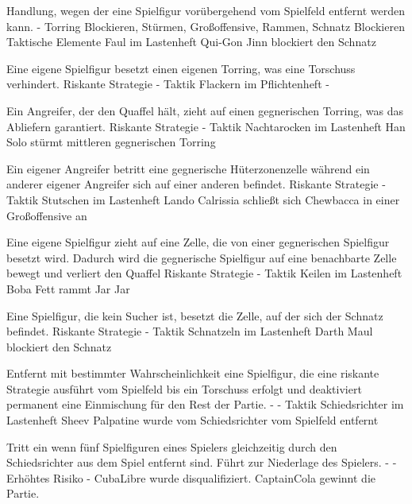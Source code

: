 {Handlung, wegen der eine Spielfigur vorübergehend vom Spielfeld entfernt werden kann.}
{-}
{Torring Blockieren, Stürmen, Großoffensive, Rammen, Schnatz Blockieren}
{Taktische Elemente}
{\glqq{}Faul\grqq{}  im Lastenheft}
{Qui-Gon Jinn blockiert den Schnatz}

{Eine eigene Spielfigur besetzt einen eigenen Torring, was eine Torschuss verhindert.}
{Riskante Strategie}
{-}
{Taktik}
{\glqq{}Flackern\grqq{}  im Pflichtenheft}
{-}

{Ein Angreifer, der den Quaffel hält, zieht auf einen gegnerischen Torring, was das Abliefern garantiert.}
{Riskante Strategie}
{-}
{Taktik}
{\glqq{}Nachtarocken\grqq{}  im Lastenheft}
{Han Solo stürmt mittleren gegnerischen Torring}

{Ein eigener Angreifer betritt eine gegnerische Hüterzonenzelle während ein anderer eigener Angreifer sich auf einer anderen befindet.}
{Riskante Strategie}
{-}
{Taktik}
{\glqq{}Stutschen\grqq{}  im Lastenheft}
{Lando Calrissia schließt sich Chewbacca in einer Großoffensive an}

{Eine eigene Spielfigur zieht auf eine Zelle, die von einer gegnerischen Spielfigur besetzt wird. Dadurch wird die gegnerische Spielfigur auf eine benachbarte Zelle bewegt und verliert den Quaffel}
{Riskante Strategie}
{-}
{Taktik}
{\glqq{}Keilen\grqq{}  im Lastenheft}
{Boba Fett rammt Jar Jar}

{Eine Spielfigur, die kein Sucher ist, besetzt die Zelle, auf der sich der Schnatz befindet.}
{Riskante Strategie}
{-}
{Taktik}
{\glqq{}Schnatzeln\grqq{}  im Lastenheft}
{Darth Maul blockiert den Schnatz}

{Entfernt mit bestimmter Wahrscheinlichkeit eine Spielfigur, die eine riskante Strategie ausführt vom Spielfeld bis ein Torschuss erfolgt und deaktiviert permanent eine Einmischung für den Rest der Partie.}
{-}
{-}
{Taktik}
{\glqq{}Schiedsrichter\grqq{}  im Lastenheft}
{Sheev Palpatine wurde vom Schiedsrichter vom Spielfeld entfernt}

{Tritt ein wenn fünf Spielfiguren eines Spielers gleichzeitig durch den Schiedsrichter aus dem Spiel entfernt sind. Führt zur Niederlage des Spielers.}
{-}
{-}
{Erhöhtes Risiko}
{-}
{CubaLibre wurde disqualifiziert. CaptainCola gewinnt die Partie.}